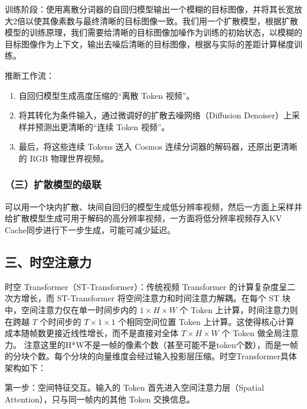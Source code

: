 训练阶段：使用离散分词器的自回归模型输出一个模糊的目标图像，并将其长宽放大2倍以使其像素数与最终清晰的目标图像一致。我们用一个扩散模型，根据扩散模型的训练原理，我们需要给清晰的目标图像加噪作为训练的初始状态，以模糊的目标图像作为上下文，输出去噪后清晰的目标图像，根据与实际的差距计算梯度训练。

推断工作流：

\begin{enumerate}
\def\labelenumi{\arabic{enumi}.}
\item
  自回归模型生成高度压缩的``离散 Token 视频''。
\item
  将其转化为条件输入，通过微调好的扩散去噪网络（Diffusion Denoiser）上采样并预测出更清晰的``连续 Token 视频''。
\item
  最后，将这些连续 Tokens 送入 Cosmos 连续分词器的解码器，还原出更清晰的 RGB 物理世界视频。
\end{enumerate}

\hypertarget{ux4e09ux6269ux6563ux6a21ux578bux7684ux7ea7ux8054}{%
\subsubsection{（三）扩散模型的级联}\label{ux4e09ux6269ux6563ux6a21ux578bux7684ux7ea7ux8054}}

可以用一个块内扩散、块间自回归的模型生成低分辨率视频，然后一方面上采样并给扩散模型生成可用于解码的高分辨率视频，一方面将低分辨率视频存入KV Cache同步进行下一步生成，可能可减少延迟。

\hypertarget{ux4e09ux65f6ux7a7aux6ce8ux610fux529b}{%
\subsection{三、时空注意力}\label{ux4e09ux65f6ux7a7aux6ce8ux610fux529b}}

时空 Transformer（ST-Transformer）：传统视频 Transformer 的计算复杂度呈二次方增长，而 ST-Transformer 将空间注意力和时间注意力解耦。在每个 ST 块中，空间注意力仅在单一时间步内的 \(1\times H\times W\) 个 Token 上计算，时间注意力则在跨越 \(T\) 个时间步的 \(T\times 1\times 1\) 个相同空间位置 Token 上计算。这使得核心计算成本随帧数更接近线性增长，而不是直接对全体 \(T\times H\times W\) 个 Token 做全局注意力。
注意这里的H*W不是一帧的像素个数（甚至可能不是token个数），而是一帧的分块个数。每个分块的向量维度会经过输入投影层压缩。时空Transformer具体架构如下：

第一步：空间特征交互。输入的 Token 首先进入空间注意力层（Spatial Attention），只与同一帧内的其他 Token 交换信息。

